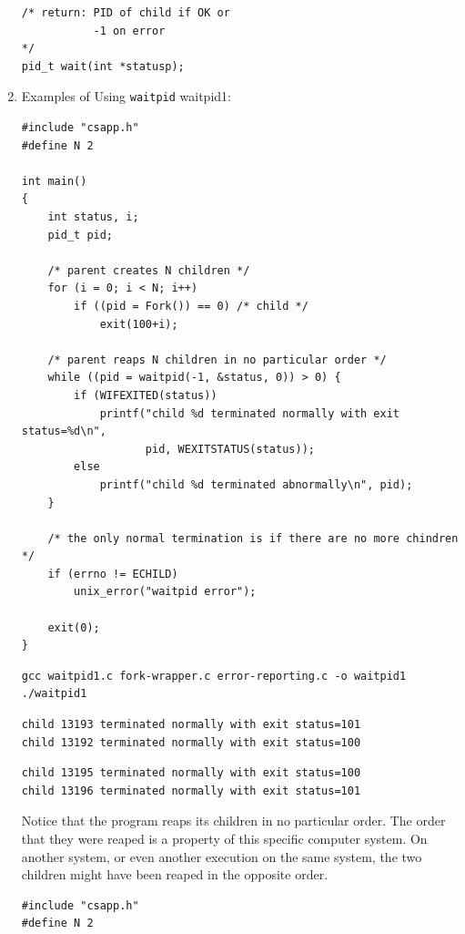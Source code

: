 \documentclass[11pt]{article}
\begin{document}
\begin{enumerate}
\begin{verbatim}
/* return: PID of child if OK or
           -1 on error
*/
pid_t wait(int *statusp);

\end{verbatim}


\item Examples of Using \texttt{waitpid}
\label{sec:orgabded32}
waitpid1:\\
\begin{verbatim}
#include "csapp.h"
#define N 2

int main()
{
    int status, i;
    pid_t pid;

    /* parent creates N children */
    for (i = 0; i < N; i++)
        if ((pid = Fork()) == 0) /* child */
            exit(100+i);

    /* parent reaps N children in no particular order */
    while ((pid = waitpid(-1, &status, 0)) > 0) {
        if (WIFEXITED(status))
            printf("child %d terminated normally with exit status=%d\n",
                   pid, WEXITSTATUS(status));
        else
            printf("child %d terminated abnormally\n", pid);
    }

    /* the only normal termination is if there are no more chindren */
    if (errno != ECHILD)
        unix_error("waitpid error");

    exit(0);
}

\end{verbatim}

\begin{verbatim}
gcc waitpid1.c fork-wrapper.c error-reporting.c -o waitpid1  
./waitpid1
\end{verbatim}

\begin{verbatim}
child 13193 terminated normally with exit status=101
child 13192 terminated normally with exit status=100
\end{verbatim}
\begin{verbatim}
child 13195 terminated normally with exit status=100
child 13196 terminated normally with exit status=101
\end{verbatim}

Notice that the program reaps its children in no particular order. The order that they were reaped is a property of this specific computer system. On another system, or even another execution on the same system, the two children might have been reaped in the opposite order.\\

\begin{verbatim}
#include "csapp.h"
#define N 2


\end{verbatim}
\end{enumerate}
\end{document}
